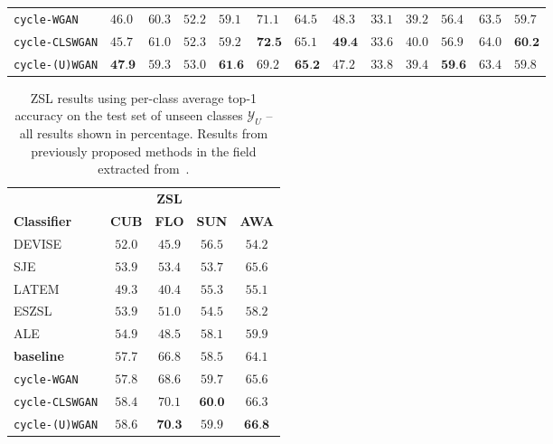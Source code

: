 \documentclass[runningheads]{llncs}
\begin{document}
\begin{table}[ht]
{\begin{tabular}{|l|lll|lll|lll|lll|}
\texttt{cycle-WGAN} 
& $46.0$ & $60.3$ & $52.2$ & $59.1$ & $71.1$ & $64.5$ & $48.3$ & $33.1$ & $39.2$ & $56.4$ & $63.5$ & $59.7$ \\ 

\texttt{cycle-CLSWGAN} 
& $45.7$ & $61.0$ & $52.3$ 
& $59.2$ & $\textbf{72.5}$ & $65.1$ & $\textbf{49.4}$ & $33.6$ & $\mathbf{40.0}$
&$56.9$ & $64.0$ & $\textbf{60.2}$
 \\ 
 
\texttt{cycle-(U)WGAN} 
& $\textbf{47.9}$ & $59.3$ & $\mathbf{53.0}$ 
& $\textbf{61.6}$ & $69.2$ & $\textbf{65.2}$ & $47.2$ & $33.8$ & $39.4$ 
& $\textbf{59.6}$ & $63.4$ & $59.8$
 \\ \hline
 
              \end{tabular}
}
\end{table}
 

\begin{table}
\centering
\caption{ZSL results using per-class average top-1 accuracy on the test set of unseen classes $\mathcal{Y}_U$ -- all results shown in percentage. Results from previously proposed methods in the field extracted from~\cite{XianCVPR2017}.}
\label{table:zsl_results}
\centering
\begin{tabular}{l|c|c|c|c}
\hline
& & \textbf{ZSL} &
\\
\textbf{Classifier}  
& \textbf{CUB} 
& \textbf{FLO} 
& \textbf{SUN}
& \textbf{AWA }
\\ \hline
DEVISE~\cite{frome2013devise}          & $52.0$ & $45.9$ & $56.5$ & $54.2$ \\
SJE~\cite{akata2015evaluation}         & $53.9$ & $53.4$ & $53.7$ & $65.6$ \\
LATEM~\cite{xian2016latent}            & $49.3$ & $40.4$ & $55.3$ & $55.1$ \\
ESZSL~\cite{romera2015embarrassingly}  & $53.9$ & $51.0$ & $54.5$ & $58.2$ \\
ALE~\cite{akata2016label}              & $54.9$ & $48.5$ & $58.1$ & $59.9$
\\ \hline

\textbf{baseline} \cite{XianCVPR2018} 

& $57.7$ & $66.8$ & $58.5$ & $64.1$
\\

\texttt{cycle-WGAN} 
& $57.8$ & $68.6$ & $59.7$ & $65.6$
\\

\texttt{cycle-CLSWGAN} 
& $58.4$ & $70.1$ & $\textbf{60.0}$ & $66.3$
 \\
 
\texttt{cycle-(U)WGAN} 
& $\mathbf{58.6}$ & $\textbf{70.3}$  & $59.9$ & $\textbf{66.8}$
 \\ \hline
 
 \end{tabular}
\end{table} 
\end{document}
